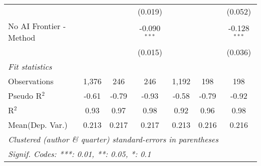 \begin{tabular}{lcccccc}
                           &                &               & (0.019)        &                &         & (0.052)\\   
   No AI Frontier - Method &                &               & -0.090$^{***}$ &                &         & -0.128$^{***}$\\   
                           &                &               & (0.015)        &                &         & (0.036)\\   
   \midrule
   \emph{Fit statistics}\\
   Observations            & 1,376          & 246           & 246            & 1,192          & 198     & 198\\  
   Pseudo R$^2$            & -0.61          & -0.79         & -0.93          & -0.58          & -0.79   & -0.92\\  
   R$^2$                   & 0.93           & 0.97          & 0.98           & 0.92           & 0.96    & 0.98\\  
Mean(Dep. Var.) & 0.213 & 0.217 & 0.217 & 0.213 & 0.216 & 0.216 \\
   \midrule \midrule
   \multicolumn{7}{l}{\emph{Clustered (author \& quarter) standard-errors in parentheses}}\\
   \multicolumn{7}{l}{\emph{Signif. Codes: ***: 0.01, **: 0.05, *: 0.1}}\\
\end{tabular}
\par\endgroup
